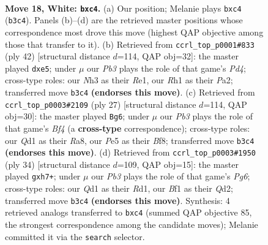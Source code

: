 \documentclass[11pt]{article}
\begin{document}
\clearpage

\begin{figure}[p]\centering
\begin{subfigure}{0.46\textwidth}\centering
\resizebox{\linewidth}{!}{%
\newchessgame
\chessboard[
  setfen={rn1k3r/3n4/bp2p1p1/pNq1Pp2/2p2P1p/1P5N/P2K2PP/R2Q1B1R w - - 0 18},
  showmover=false,
  pgfstyle=straightmove, color=movearrow, markmove={b3-c4}
]}
\caption{}
\end{subfigure}\hfill
\begin{subfigure}{0.46\textwidth}\centering
\resizebox{\linewidth}{!}{%
\newchessgame
\chessboard[
  setfen={2r2r1k/2pn1qnp/1p1p4/p2Np1p1/2PP4/5PN1/PP4PP/R2QR1K1 w - - 3 22},
  showmover=false,
  pgfstyle=straightmove, color=movearrow, markmove={d4-e5}
]}
\caption{}
\end{subfigure}
\\[4pt]
\begin{subfigure}{0.46\textwidth}\centering
\resizebox{\linewidth}{!}{%
\newchessgame
\chessboard[
  setfen={r3kb1r/ppq4p/2p2p2/4nbp1/P2Q4/2N1N1P1/1P2PPBP/R3K2R b KQkq - 1 14},
  showmover=false,
  pgfstyle=straightmove, color=movearrow, markmove={f5-g6}
]}
\caption{}
\end{subfigure}\hfill
\begin{subfigure}{0.46\textwidth}\centering
\resizebox{\linewidth}{!}{%
\newchessgame
\chessboard[
  setfen={r2b1rk1/2qn2pp/p2p2P1/1p1Ppp1n/8/PN2BP2/1PPQ3P/1K1R1B1R w - - 0 18},
  showmover=false,
  pgfstyle=straightmove, color=movearrow, markmove={g6-h7}
]}
\caption{}
\end{subfigure}
\caption{\textbf{Move 18, White: \texttt{bxc4}.} (a) Our position; Melanie plays \texttt{bxc4} (\texttt{b3c4}). Panels (b)--(d) are the retrieved master positions whose correspondence most drove this move (highest QAP objective among those that transfer to it). (b) Retrieved from \texttt{ccrl\_top\_p0001\#833} (ply 42) [structural distance $d$=114, QAP obj=32]: the master played \texttt{dxe5}; under $\mu$ our \emph{Pb3} plays the role of that game's \emph{Pd4}; cross-type roles: our \emph{N}h3 as their \emph{R}e1, our \emph{R}h1 as their \emph{P}a2; transferred move \texttt{b3c4} \textbf{(endorses this move)}. (c) Retrieved from \texttt{ccrl\_top\_p0003\#2109} (ply 27) [structural distance $d$=114, QAP obj=30]: the master played \texttt{Bg6}; under $\mu$ our \emph{Pb3} plays the role of that game's \emph{Bf4} (a \textbf{cross-type} correspondence); cross-type roles: our \emph{Q}d1 as their \emph{R}a8, our \emph{P}e5 as their \emph{B}f8; transferred move \texttt{b3c4} \textbf{(endorses this move)}. (d) Retrieved from \texttt{ccrl\_top\_p0003\#1950} (ply 34) [structural distance $d$=109, QAP obj=15]: the master played \texttt{gxh7+}; under $\mu$ our \emph{Pb3} plays the role of that game's \emph{Pg6}; cross-type roles: our \emph{Q}d1 as their \emph{R}d1, our \emph{B}f1 as their \emph{Q}d2; transferred move \texttt{b3c4} \textbf{(endorses this move)}. Synthesis: 4 retrieved analogs transferred to \texttt{bxc4} (summed QAP objective 85, the strongest correspondence among the candidate moves); Melanie committed it via the \texttt{search} selector.}
\label{fig:thought-m34}
\end{figure}
\end{document}

